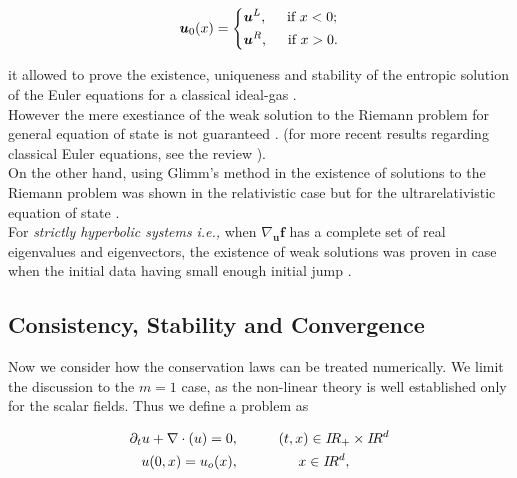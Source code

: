 \documentclass[11pt,a4paper,headinclude=true,DIV=14,BCOR=8mm,chapterprefix,listof=totoc,twoside,openright,abstracton]{scrbook}
\begin{document}
\begin{equation}
    \boldsymbol{u}_0(x) = 
    \begin{dcases}
        \boldsymbol{u}^L, \hspace{5mm} \text{if } x<0; \\
        \boldsymbol{u}^R, \hspace{5mm} \text{if } x>0.
    \end{dcases}
\end{equation}

it allowed to prove the existence, uniqueness and stability of the entropic solution of the Euler equations for a classical ideal-gas \cite{Chen:2003}. \\

However the mere exestiance of the weak solution to the Riemann problem for general equation of state is not guaranteed \cite{Curtis:1972}. (for more recent results regarding classical Euler equations, see the review \cite{Chen:2006}). \\

On the other hand, using Glimm’s method \cite{Glimm:1965} in the existence of solutions to the Riemann problem was shown in the relativistic case but for the ultrarelativistic equation of state \cite{Smoller:1993}. \\

For \textit{strictly hyperbolic systems} \textit{i.e.,} when $\nabla_{\boldsymbol{u}}\boldsymbol{f}$ has a complete set of real eigenvalues and eigenvectors, the existence of weak solutions was proven in case when the initial data having small enough initial jump \cite{Lax:1957}.

\subsection{Consistency, Stability and Convergence}

Now we consider how the conservation laws can be treated numerically. We limit the discussion to the $m=1$ case, as the non-linear theory is well established only for the scalar fields. Thus we define a problem as 

\begin{align}
    \partial_t u + \nabla\cdot\boldmath(u) = 0&, \hspace{10mm} (t,x) \in I\!R_{+}\times I\! R^d \\ 
    u(0, x) = u_o(x)&, \hspace{15mm} x\in I\!R^{d},
\end{align}
\end{document}
